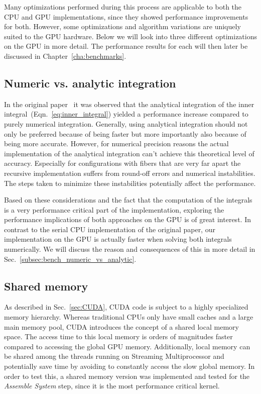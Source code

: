 Many optimizations performed during this process are applicable to both the CPU and GPU implementations, since they showed performance improvements for both. However, some optimizations and algorithm variations are uniquely suited to the GPU hardware. Below we will look into three different optimizations on the GPU in more detail. The performance results for each will then later be discussed in Chapter~\ref{cha:benchmarks}.

\subsection{Numeric vs. analytic integration}
\label{subsec:numeric_analytic}
In the original paper~\cite{Tornberg2006} it was observed that the analytical integration of the inner integral~(Eqn.~\eqref{eq:inner_integral}) yielded a performance increase compared to purely numerical integration. Generally, using analytical integration should not only be preferred because of being faster but more importantly also because of being more accurate. However, for numerical precision reasons the actual implementation of the analytical integration can't achieve this theoretical level of accuracy. Especially for configurations with fibers that are very far apart the recursive implementation suffers from round-off errors and numerical instabilities. The steps taken to minimize these instabilities potentially affect the performance.

Based on these considerations and the fact that the computation of the integrals is a very performance critical part of the implementation, exploring the performance implications of both approaches on the GPU is of great interest. In contrast to the serial CPU implementation of the original paper, our implementation on the GPU is actually faster when solving both integrals numerically. We will discuss the reason and consequences of this in more detail in Sec.~\ref{subsec:bench_numeric_vs_analytic}.

\subsection{Shared memory}
\label{subsec:shared_memory}

As described in Sec.~\ref{sec:CUDA}, CUDA code is subject to a highly specialized memory hierarchy. Whereas traditional CPUs only have small caches and a large main memory pool, CUDA introduces the concept of a shared local memory space. The access time to this local memory is orders of magnitudes faster compared to accessing the global GPU memory. Additionally, local memory can be shared among the threads running on Streaming Multiprocessor and potentially save time by avoiding to constantly access the slow global memory. In order to test this, a shared memory version was implemented and tested for the \emph{Assemble System} step, since it is the most performance critical kernel.

